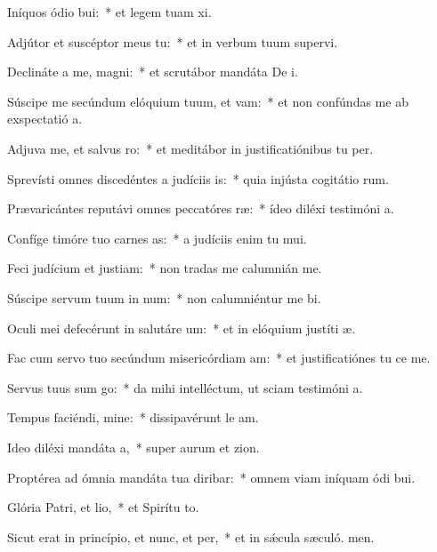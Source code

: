 \item Iníquos ódio bui:~* et legem tuam xi.
\item Adjútor et suscéptor meus  tu:~* et in verbum tuum supervi.
\item Declináte a me, magni:~* et scrutábor mandáta De i.
\item Súscipe me secúndum elóquium tuum, et vam:~* et non confúndas me ab exspectatió a.
\item Adjuva me, et salvus ro:~* et meditábor in justificatiónibus tu per.
\item Sprevísti omnes discedéntes a judíciis is:~* quia injústa cogitátio rum.
\item Prævaricántes reputávi omnes peccatóres ræ:~* ídeo diléxi testimóni a.
\item Confíge timóre tuo carnes as:~* a judíciis enim tu mui.
\item Feci judícium et justiam:~* non tradas me calumnián me.
\item Súscipe servum tuum in num:~* non calumniéntur me bi.
\item Oculi mei defecérunt in salutáre um:~* et in elóquium justíti æ.
\item Fac cum servo tuo secúndum misericórdiam am:~* et justificatiónes tu ce me.
\item Servus tuus sum go:~* da mihi intelléctum, ut sciam testimóni a.
\item Tempus faciéndi, mine:~* dissipavérunt le am.
\item Ideo diléxi mandáta a,~* super aurum et zion.
\item Proptérea ad ómnia mandáta tua diribar:~* omnem viam iníquam ódi bui.
\item Glória Patri, et lio,~* et Spirítu to.
\item Sicut erat in princípio, et nunc, et per,~* et in sǽcula sæculó. men.
